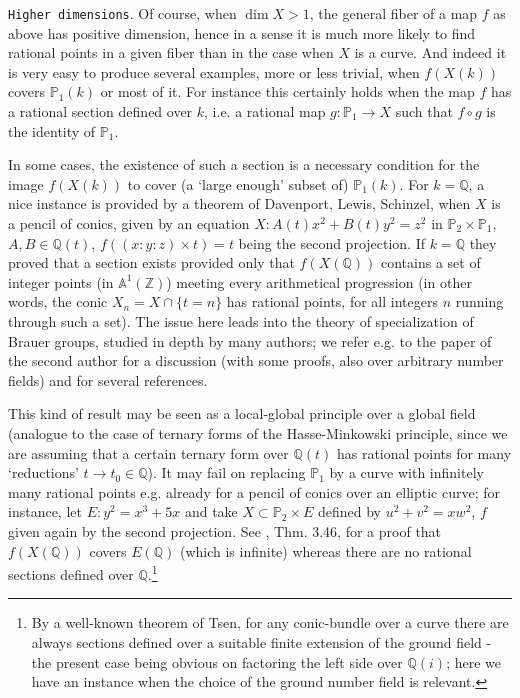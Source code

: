 \documentclass[leqno,12pt]{article} %
\def\A{{{\mathbb A}}}
\def\Z{{{\mathbb Z}}}
\def\Q{{{\mathbb Q}}}
\def\P{{{\mathbb P}}}
\theoremstyle{plain} %
\theoremstyle{definition} %
\begin{document}
\medskip

{\tt Higher dimensions}. Of course, when $\dim X>1$, the general fiber of a map $f$ as above has positive dimension, hence in a sense  it is much more likely to find rational points in a given fiber than in the case when $X$ is a curve. And indeed it is very easy to produce several examples, more or less trivial,  when $f(X(k))$ covers $\P_1(k)$ or most of it. For instance  this certainly holds when the map $f$ has a rational section defined over $k$, i.e. a rational map  $g:\P_1\to X$ such that  $f\circ g$ is the identity of $\P_1$.  

In some cases, the existence of such a section is a necessary condition for the image $f(X(k))$ to cover (a `large enough' subset of) $\P_1(k)$.  For $k=\Q$, a  nice instance is provided by a theorem of {\sc Davenport, Lewis, Schinzel}, when $X$ is a pencil of conics, given by an equation $X:A(t)x^2+B(t)y^2=z^2$ in $\P_2\times \P_1$, $A,B\in\Q(t)$, $f((x:y:z)\times t)=t$ being the second projection.  If $k=\Q$ they proved that a section exists provided only that $f(X(\Q))$ contains  a set of integer points (in $\A^1(\Z)$) meeting every arithmetical progression (in other words, the conic $X_n= X\cap \{t=n\}$  has rational points, for all integers  $n$ running  through such a set). The issue here leads into the theory of specialization of Brauer groups, studied in depth by many authors;   we refer e.g. to the paper \cite{ZEns} of the second author  for a discussion (with some proofs, also over arbitrary number fields) and for several references.  

This kind of result may be seen as a local-global principle over a 
global field (analogue to the case of ternary forms of the Hasse-Minkowski principle, since we are assuming that a certain ternary form over $\Q(t)$ has rational points for many `reductions' $t\to t_0\in\Q$). It may fail on replacing $\P_1$ by a curve with infinitely many rational points e.g. already for a pencil of conics over  an elliptic curve; for instance, let $E:y^2=x^3+5x$ and  take $X\subset \P_2\times E$ defined by $u^2+v^2=xw^2$, $f$ given again by the second projection. See \cite{CZ-libro}, Thm. 3.46, for a proof that   $f(X(\Q))$ covers $E(\Q)$ (which is infinite) whereas there are no rational sections defined over $\Q$.\footnote{By a well-known theorem of Tsen, for any  conic-bundle  over a curve there are always sections defined over  a suitable finite extension of the ground field - the present case being obvious on factoring the left side over $\Q(i)$; here we have an instance when the choice of the ground number field is relevant.}
\end{document}
